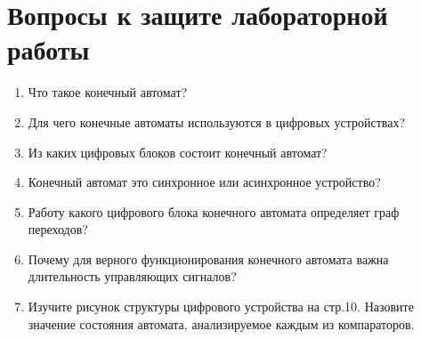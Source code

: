 \clearpage

\section{Вопросы к защите лабораторной работы}

\begin{enumerate}%
  \item{Что такое конечный автомат?}
  \item{Для чего конечные автоматы используются в цифровых устройствах?}
  \item{Из каких цифровых блоков состоит конечный автомат?}
  \item{Конечный автомат это синхронное или асинхронное устройство?}
  \item{Работу какого цифрового блока конечного автомата определяет граф переходов?}
  \item{Почему для верного функционирования конечного автомата важна длительность управляющих сигналов?}
  \item{Изучите рисунок структуры цифрового устройства на стр.10. Назовите значение состояния автомата, анализируемое каждым из компараторов.}

\end{enumerate}

